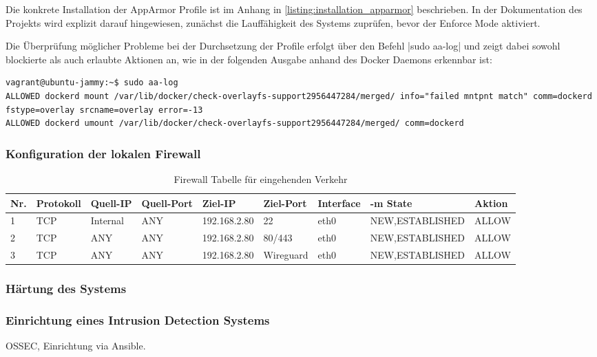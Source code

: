 Die konkrete Installation der AppArmor Profile ist im Anhang in \autoref{listing:installation_apparmor} beschrieben. In der Dokumentation des Projekts wird explizit darauf hingewiesen, zunächst die Lauffähigkeit des Systems zuprüfen, bevor der Enforce Mode aktiviert.

Die Überprüfung möglicher Probleme bei der Durchsetzung der Profile erfolgt über den Befehl |sudo aa-log|
und zeigt dabei sowohl blockierte als auch erlaubte Aktionen an, wie in der folgenden Ausgabe anhand des Docker Daemons erkennbar ist:

\begin{verbatim}
vagrant@ubuntu-jammy:~$ sudo aa-log 
ALLOWED dockerd mount /var/lib/docker/check-overlayfs-support2956447284/merged/ info="failed mntpnt match" comm=dockerd fstype=overlay srcname=overlay error=-13
ALLOWED dockerd umount /var/lib/docker/check-overlayfs-support2956447284/merged/ comm=dockerd
\end{verbatim}

\subsubsection{Konfiguration der lokalen Firewall}


\begin{table}[!ht]
    \centering
    \begin{adjustbox}{width=\textwidth}

    \begin{tabular}{|l|l|l|l|l|l|l|l|l|}
        \hline
            Nr. & Protokoll & Quell-IP & Quell-Port & Ziel-IP & Ziel-Port & Interface & -m State & Aktion \\ \hline
            1 & TCP & Internal & ANY & 192.168.2.80 & 22 & eth0 & NEW,ESTABLISHED & ALLOW \\ \hline
            2 & TCP & ANY & ANY & 192.168.2.80 & 80/443 & eth0 & NEW,ESTABLISHED & ALLOW \\ \hline
            3 & TCP & ANY & ANY & 192.168.2.80 & Wireguard & eth0 & NEW,ESTABLISHED & ALLOW \\ \hline
        \end{tabular}
    \end{adjustbox}
    \caption{Firewall Tabelle für eingehenden Verkehr}
    \label{regeln_fw_incoming}
\end{table}

\subsubsection{Härtung des Systems}


\subsubsection{Einrichtung eines Intrusion Detection Systems}

OSSEC, Einrichtung via Ansible.
